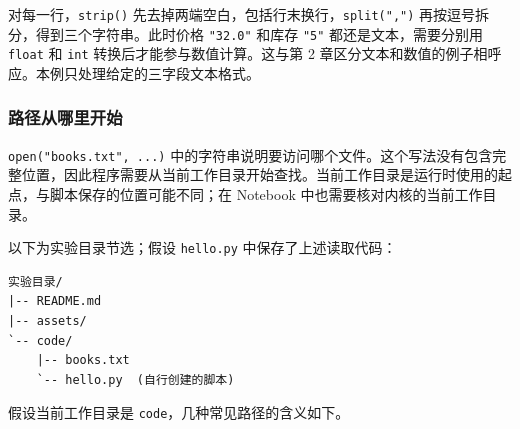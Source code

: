 \documentclass[UTF8,a4paper,11pt,fontset=fandol]{ctexart}
\providecommand{\passthrough}[1]{#1}
\begin{document}
对每一行，\passthrough{\lstinline!strip()!} 先去掉两端空白，包括行末换行，\passthrough{\lstinline!split(",")!} 再按逗号拆分，得到三个字符串。此时价格 \passthrough{\lstinline!"32.0"!} 和库存 \passthrough{\lstinline!"5"!} 都还是文本，需要分别用 \passthrough{\lstinline!float!} 和 \passthrough{\lstinline!int!} 转换后才能参与数值计算。这与第 2 章区分文本和数值的例子相呼应。本例只处理给定的三字段文本格式。

\clearpage

\subsubsection{路径从哪里开始}\label{ux8defux5f84ux4eceux54eaux91ccux5f00ux59cb}

\passthrough{\lstinline!open("books.txt", ...)!} 中的字符串说明要访问哪个文件。这个写法没有包含完整位置，因此程序需要从当前工作目录开始查找。当前工作目录是运行时使用的起点，与脚本保存的位置可能不同；在 Notebook 中也需要核对内核的当前工作目录。

以下为实验目录节选；假设 \passthrough{\lstinline!hello.py!} 中保存了上述读取代码：

\begin{lstlisting}[language={}]
实验目录/
|-- README.md
|-- assets/
`-- code/
    |-- books.txt
    `-- hello.py  (自行创建的脚本)
\end{lstlisting}

假设当前工作目录是 \passthrough{\lstinline!code!}，几种常见路径的含义如下。
\end{document}
